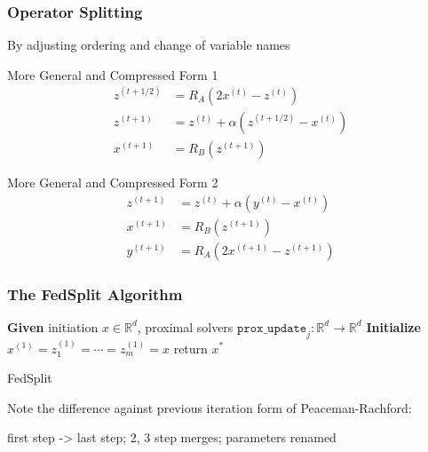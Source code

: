 \begin{frame}
\frametitle{Operator Splitting}

By adjusting ordering and change of variable names

\begin{block}{More General and Compressed Form 1}
\ 
\vspace{-1.3em}
\begin{align*}
z^{(t+1/2)} & = R_A(2x^{(t)} - z^{(t)}) \\
z^{(t+1)} & = z^{(t)} + \alpha (z^{(t+1/2)} - x^{(t)}) \\
x^{(t+1)} & = R_B(z^{(t+1)})
\end{align*}
\end{block}

\begin{block}{More General and Compressed Form 2}
\ 
\vspace{-1.3em}
\begin{align*}
z^{(t+1)} & = z^{(t)} + \alpha (y^{(t)} - x^{(t)}) \\
x^{(t+1)} & = R_B(z^{(t+1)}) \\
y^{(t+1)} & = R_A(2x^{(t+1)} - z^{(t+1)})
\end{align*}
\end{block}

\end{frame}


\begin{frame}
\frametitle{The FedSplit Algorithm}

{
\smaller
\begin{algorithm}[H]
\SetAlgoNoLine
\DontPrintSemicolon
{\bfseries Given} initiation $x\in\mathbb{R}^d$, proximal solvers $\texttt{prox\_update}_j: \mathbb{R}^d \to \mathbb{R}^d$ \;
{\bfseries Initialize} $x^{(1)} = z_1^{(1)} = \cdots = z_m^{(1)} = x$\;
return $x^*$\;
\caption{FedSplit}
\end{algorithm}
}

Note the difference against previous iteration form of Peaceman-Rachford:
\begin{center}
first step -> last step; 2, 3 step merges; parameters renamed
\end{center}

\end{frame}

